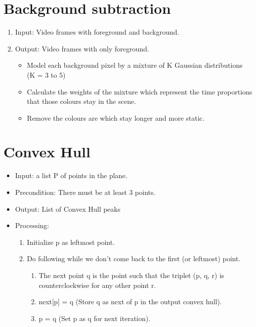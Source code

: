 \documentclass{scrreprt}
\begin{document}
\section{Background subtraction}

\begin{enumerate}
    \item Input: Video frames with foreground and background.
    \item Output: Video frames with only foreground. 
    \begin{itemize}
        \item Model each background pixel by a mixture of K Gaussian distributions (K = 3 to 5)
        \item Calculate the weights of the mixture which represent the time proportions that those colours stay in the scene.
        \item Remove the colours are which stay longer and more static.
    \end{itemize}
\end{enumerate}
\section{Convex Hull}
\begin{itemize}
    \item Input: a list P of points in the plane.
    \item Precondition: There must be at least 3 points.
    \item Output: List of Convex Hull peaks
    \item Processing:
    \begin{enumerate}
        \item Initialize p as leftmost point.
        \item Do following while we don’t come back to the first (or leftmost) point.
        \begin{enumerate}
            \item The next point q is the point such that the triplet (p, q, r) is counterclockwise for any other point r.
            \item next[p] = q (Store q as next of p in the output convex hull).
            \item p = q (Set p as q for next iteration).
        \end{enumerate}
    \end{enumerate}
\end{itemize}
\end{document}
